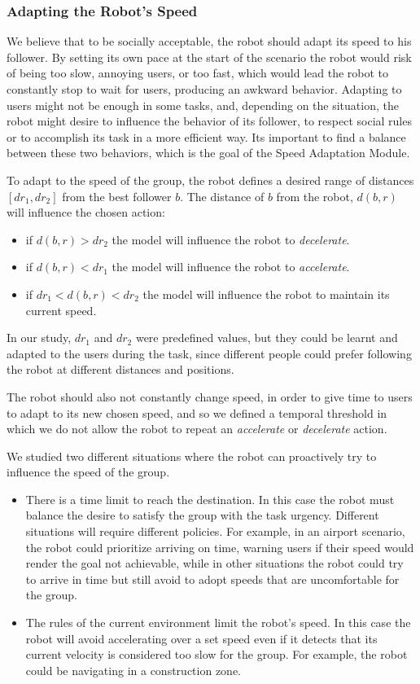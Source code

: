 \subsubsection{Adapting the Robot's Speed}
We believe that to be socially acceptable, the robot should adapt its speed to his follower. By setting its own pace at the start of the scenario the robot  would risk of being too slow, annoying users, or too fast, which would lead the robot to constantly stop to wait for users, producing an awkward behavior. Adapting to users might not be enough in some tasks, and, depending on the situation, the robot might desire to influence the behavior of its follower, to respect social rules or to accomplish its task in a more efficient way. Its important to find a balance between these two behaviors, which is the goal of the Speed Adaptation Module. 

To adapt to the speed of the group, the robot defines a desired range of distances $[dr_1,dr_2]$ from the best follower $b$. The distance of $b$ from the robot, $d(b,r)$ will influence the chosen action:
\begin{itemize}
\item if $d(b,r)>dr_2$  the model will influence the robot to \textit{decelerate}.
\item if $d(b,r)<dr_1$ the model will influence the robot to \textit{accelerate}.
\item if $dr_1<d(b,r)<dr_2$ the model will influence the robot to maintain its current speed.
\end{itemize} 

In our study, $dr_1$ and $dr_2$ were predefined values, but they could be learnt and adapted to the users during the task, since different people could prefer following the robot at different distances and positions.

The robot should also not constantly change speed, in order to give time to users to adapt to its new chosen speed, and so we defined a temporal threshold in which we do not allow the robot to repeat an \textit{accelerate} or \textit{decelerate} action.

We studied two different situations where the robot can proactively try to influence the speed of the group.
\begin{itemize}
\item There is a time limit to reach the destination. In this case the robot must balance the desire to satisfy the group with the task urgency. Different situations will require different policies. For example, in an airport scenario, the robot could prioritize arriving on time, warning users if their speed would render the goal not achievable, while in other situations the robot could try to arrive in time but still avoid to adopt speeds that are uncomfortable for the group.
\item The rules of the current environment limit the robot's speed. In this case the robot will avoid accelerating over a set speed even if it detects that its current velocity is considered too slow for the group. For example, the robot could be navigating in a construction zone.
\end{itemize}


